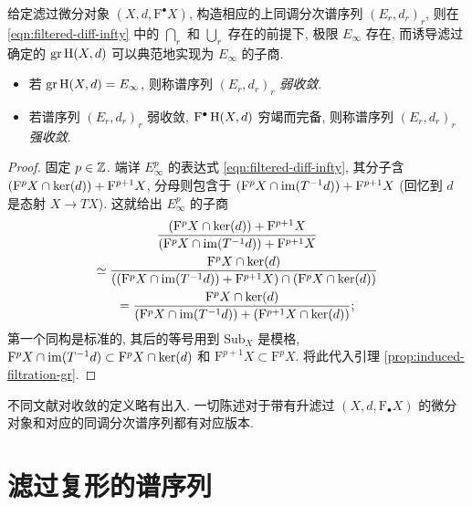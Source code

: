 \begin{definition-proposition}\label{def:diff-obj-convergence}
	给定滤过微分对象 $(X, d, \mathrm{F}^\bullet X)$, 构造相应的上同调分次谱序列 $(E_r, d_r)_r$, 则在 \eqref{eqn:filtered-diff-infty} 中的 $\bigcap_r$ 和 $\bigcup_r$ 存在的前提下, 极限 $E_\infty$ 存在, 而诱导滤过确定的 $\operatorname{gr} \operatorname{H}(X,d)$ 可以典范地实现为 $E_\infty$ 的子商.
	\begin{itemize}
		\item 若 $\operatorname{gr} \operatorname{H}(X,d) = E_\infty$, 则称谱序列 $(E_r, d_r)_r$ \emph{弱收敛}.
		\item 若谱序列 $(E_r, d_r)_r$ 弱收敛, $\mathrm{F}^\bullet \operatorname{H}(X,d)$ 穷竭而完备, 则称谱序列 $(E_r, d_r)_r$ \emph{强收敛}.
	\end{itemize}
\end{definition-proposition}
\begin{proof}
	固定 $p \in \mathbb{Z}$. 端详 $E_\infty^p$ 的表达式 \eqref{eqn:filtered-diff-infty}, 其分子含 $(\mathrm{F}^p X \cap \operatorname{ker}(d)) + \mathrm{F}^{p+1} X$, 分母则包含于 $(\mathrm{F}^p X \cap \operatorname{im}(T^{-1} d)) + \mathrm{F}^{p+1} X$ (回忆到 $d$ 是态射 $X \to TX$). 这就给出 $E_\infty^p$ 的子商
	\begin{multline*}
		\dfrac{(\mathrm{F}^p X \cap \operatorname{ker}(d)) + \mathrm{F}^{p+1} X}{(\mathrm{F}^p X \cap \operatorname{im}(T^{-1} d)) + \mathrm{F}^{p+1} X} \\
		\simeq \dfrac{\mathrm{F}^p X \cap \operatorname{ker}(d)}{ \left( (\mathrm{F}^p X \cap \operatorname{im}(T^{-1} d)) + \mathrm{F}^{p+1} X \right) \cap \left( \mathrm{F}^p X \cap \operatorname{ker}(d) \right) } \\
		= \dfrac{\mathrm{F}^p X \cap \operatorname{ker}(d)}{ (\mathrm{F}^p X \cap \operatorname{im}(T^{-1} d)) + (\mathrm{F}^{p+1} X \cap \operatorname{ker}(d)) };
	\end{multline*}
	第一个同构是标准的, 其后的等号用到 $\mathrm{Sub}_X$ 是模格, $\mathrm{F}^p X \cap \operatorname{im}(T^{-1} d) \subset \mathrm{F}^p X \cap \operatorname{ker}(d)$ 和 $\mathrm{F}^{p+1} X \subset \mathrm{F}^p X$. 将此代入引理 \ref{prop:induced-filtration-gr}.
\end{proof}

不同文献对收敛的定义略有出入. 一切陈述对于带有升滤过 $(X, d, \mathrm{F}_\bullet X)$ 的微分对象和对应的同调分次谱序列都有对应版本.

\section{滤过复形的谱序列}\label{sec:filtered-cplx-ss}

